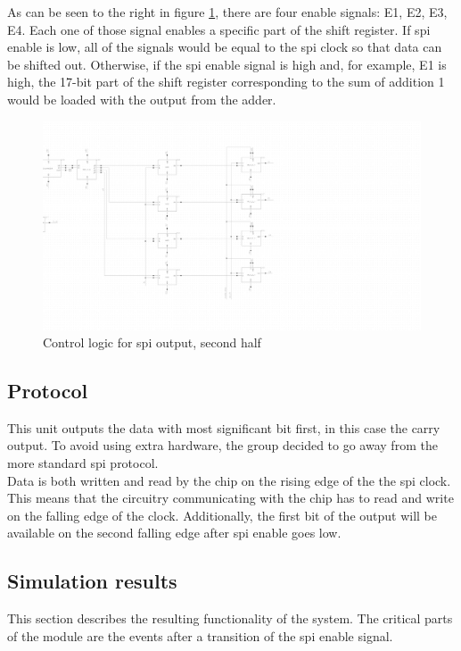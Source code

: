 \newpage
\raggedright As can be seen to the right in figure \ref{spi_out2}, there are four enable signals: E1, E2, E3, E4. Each one of those signal enables a specific part of the shift register. If spi enable is low, all of the signals would be equal to the spi clock so that data can be shifted out. Otherwise, if the spi enable signal is high and, for example, E1 is high, the 17-bit part of the shift register corresponding to the sum of addition 1 would be loaded with the output from the adder.
\begin{figure}[H]
\centering
\captionsetup{justification=centering}
\includegraphics[scale=0.3]{../figures/spi_out2.png}
\caption{Control logic for spi output, second half}
\label{spi_out2}
\end{figure}

\subsection{Protocol}
This unit outputs the data with most significant bit first, in this case the carry output. To avoid using extra hardware, the group decided to go away from the more standard spi protocol.  \\
Data is both written and read by the chip on the rising edge of the the spi clock. This means that the circuitry communicating with the chip has to read and write on the falling edge of the clock. Additionally, the first bit of the output will be available on the second falling edge after spi enable goes low.

\subsection{Simulation results}
This section describes the resulting functionality of the system. The critical parts of the module are the events after a transition of the spi enable signal.

